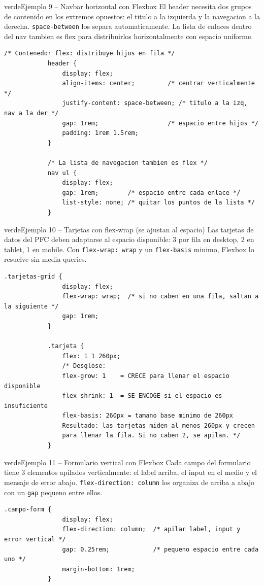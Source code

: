 \documentclass[11pt,a4paper]{article}
\begin{document}
	\begin{cajacodigo}{verde}{Ejemplo 9 -- Navbar horizontal con Flexbox}
		{\color{codigotexto}\small El header necesita dos grupos de contenido en los extremos opuestos: el titulo a la izquierda y la navegacion a la derecha. \texttt{space-between} los separa automaticamente. La lista de enlaces dentro del nav tambien es flex para distribuirlos horizontalmente con espacio uniforme.}
		\begin{lstlisting}[style=codecss]
			/* Contenedor flex: distribuye hijos en fila */
			header {
				display: flex;
				align-items: center;         /* centrar verticalmente */
				justify-content: space-between; /* titulo a la izq, nav a la der */
				gap: 1rem;                   /* espacio entre hijos */
				padding: 1rem 1.5rem;
			}
			
			/* La lista de navegacion tambien es flex */
			nav ul {
				display: flex;
				gap: 1rem;        /* espacio entre cada enlace */
				list-style: none; /* quitar los puntos de la lista */
			}
		\end{lstlisting}
	\end{cajacodigo}
	
	\begin{cajacodigo}{verde}{Ejemplo 10 -- Tarjetas con flex-wrap (se ajustan al espacio)}
		{\color{codigotexto}\small Las tarjetas de datos del PFC deben adaptarse al espacio disponible: 3 por fila en desktop, 2 en tablet, 1 en mobile. Con \texttt{flex-wrap: wrap} y un \texttt{flex-basis} minimo, Flexbox lo resuelve sin media queries.}
		\begin{lstlisting}[style=codecss]
			.tarjetas-grid {
				display: flex;
				flex-wrap: wrap;  /* si no caben en una fila, saltan a la siguiente */
				gap: 1rem;
			}
			
			.tarjeta {
				flex: 1 1 260px;
				/* Desglose:
				flex-grow: 1    = CRECE para llenar el espacio disponible
				flex-shrink: 1  = SE ENCOGE si el espacio es insuficiente
				flex-basis: 260px = tamano base minimo de 260px
				Resultado: las tarjetas miden al menos 260px y crecen
				para llenar la fila. Si no caben 2, se apilan. */
			}
		\end{lstlisting}
	\end{cajacodigo}
	
	\begin{cajacodigo}{verde}{Ejemplo 11 -- Formulario vertical con Flexbox}
		{\color{codigotexto}\small Cada campo del formulario tiene 3 elementos apilados verticalmente: el label arriba, el input en el medio y el mensaje de error abajo. \texttt{flex-direction: column} los organiza de arriba a abajo con un \texttt{gap} pequeno entre ellos.}
		\begin{lstlisting}[style=codecss]
			.campo-form {
				display: flex;
				flex-direction: column;  /* apilar label, input y error vertical */
				gap: 0.25rem;            /* pequeno espacio entre cada uno */
				margin-bottom: 1rem;
			}
		\end{lstlisting}
	\end{cajacodigo}
	
\end{document}
